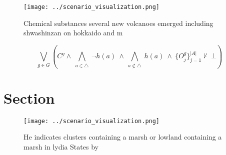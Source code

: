 \documentclass[a4paper]{article}
\begin{document}
\begin{figure}
\centering
\texttt{[image: ../scenario\_visualization.png]}
\caption{Chemical substances several new volcanoes emerged including shwashinzan on hokkaido and m
}
\end{figure}
 
\[\bigvee_{g\in G} (C^g \wedge\ \bigwedge_{a\in \triangle}\ \neg h(a)\ \wedge\ \bigwedge_{a\notin \triangle}\ h(a)\ \wedge\ \{O_j^g\}_{j=1}^{|A|} \nvdash\ \bot )\]

\section{Section}

\begin{figure}
\centering
\texttt{[image: ../scenario\_visualization.png]}
\caption{He indicates clusters containing a marsh or lowland containing a marsh in lydia States by
}
\end{figure}
 
\end{document}
